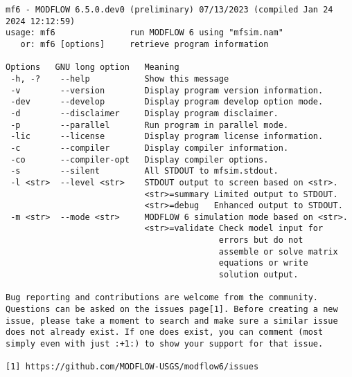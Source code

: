 {\small
\begin{lstlisting}[style=modeloutput]
mf6 - MODFLOW 6.5.0.dev0 (preliminary) 07/13/2023 (compiled Jan 24 2024 12:12:59)
usage: mf6               run MODFLOW 6 using "mfsim.nam"
   or: mf6 [options]     retrieve program information

Options   GNU long option   Meaning 
 -h, -?    --help           Show this message
 -v        --version        Display program version information.
 -dev      --develop        Display program develop option mode.
 -d        --disclaimer     Display program disclaimer.
 -p        --parallel       Run program in parallel mode.
 -lic      --license        Display program license information.
 -c        --compiler       Display compiler information.
 -co       --compiler-opt   Display compiler options.
 -s        --silent         All STDOUT to mfsim.stdout.
 -l <str>  --level <str>    STDOUT output to screen based on <str>.
                            <str>=summary Limited output to STDOUT.
                            <str>=debug   Enhanced output to STDOUT.
 -m <str>  --mode <str>     MODFLOW 6 simulation mode based on <str>.
                            <str>=validate Check model input for
                                           errors but do not 
                                           assemble or solve matrix 
                                           equations or write 
                                           solution output.
                                                                    
Bug reporting and contributions are welcome from the community. 
Questions can be asked on the issues page[1]. Before creating a new
issue, please take a moment to search and make sure a similar issue
does not already exist. If one does exist, you can comment (most
simply even with just :+1:) to show your support for that issue.
                                                                    
[1] https://github.com/MODFLOW-USGS/modflow6/issues
\end{lstlisting}
}
